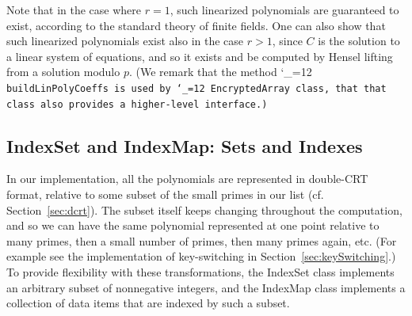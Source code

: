 \documentclass[14pt]{extarticle}
\newcommand{\secref}[1]{Section~\protect\ref{sec:#1}}
\def\IndexSet{\textsf{IndexSet}}
\def\IndexMap{\textsf{IndexMap}}
\def\class{%
\begingroup\catcode`\_=12\relax
\classwitharg}
\def\classwitharg#1{\tt #1\endgroup}
\begin{document}
Note that in the case where $r = 1$, such linearized polynomials
are guaranteed to exist, according to the standard theory 
of finite fields. One can also show that such linearized polynomials
exist also in the case $r > 1$, since $C$ is 
the solution to a linear system of equations,
and so it exists and be computed by Hensel lifting
from a solution modulo $p$.
(We remark that the method \class{buildLinPolyCoeffs} is used
by \class{EncryptedArray} class, that that class also provides
a higher-level interface.)


\subsection{{\IndexSet} and {\IndexMap}: Sets and Indexes}
\label{sec:IndexSet} \label{sec:IndexMap}
In our implementation, all the polynomials are represented in
double-CRT format, relative to some subset of the small primes in
our list (cf. \secref{dcrt}). The subset itself keeps changing
throughout the computation, and so we can have the same polynomial
represented at one point relative to many primes, then a small
number of primes, then many primes again, etc. (For example see the
implementation of key-switching in \secref{keySwitching}.) To provide
flexibility with these transformations, the {\IndexSet} class
implements an arbitrary subset of nonnegative integers, and the {\IndexMap}
class implements a collection of data items that are indexed by such
a subset.

\end{document}
